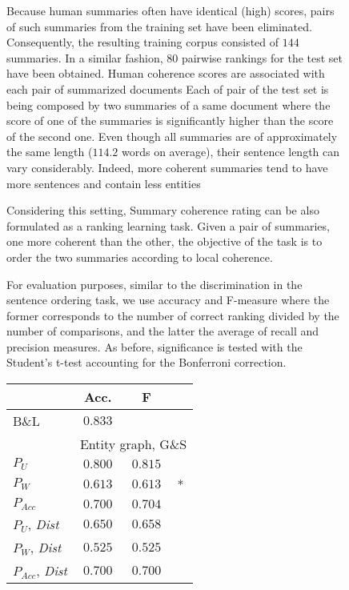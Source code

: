 \begin{figure}[!t]
Because human summaries often have identical (high) scores, pairs of such summaries from the training set have been eliminated. 
Consequently, the resulting training corpus consisted of $144$ summaries. 
In a similar fashion, $80$ pairwise rankings for the test set have been obtained. 
Human coherence scores are associated with each pair of summarized documents \cite{barzilay08} Each of pair of the test set is being composed by two summaries of a same document where the score of one of the summaries is significantly higher than the score of the second one. 
Even though all summaries are of approximately the same length ($114.2$ words on average), their sentence length can vary considerably. 
Indeed, more coherent summaries tend to have more sentences and contain less entities


Considering this setting, Summary coherence rating can be also formulated as a ranking learning task.
Given a pair of summaries, one more coherent than the other, the objective of the task is to order the two summaries according to local coherence.

For evaluation purposes, similar to the discrimination  in the sentence ordering task, we use  accuracy and F-measure where the former corresponds to the number of correct ranking divided by the number of comparisons, and the latter the average of recall and precision measures.
As before, significance is tested with the Student’s t-test accounting for the Bonferroni correction.


\begin{table}[!t]
\centering
\begin{small}
\begin{tabular}{l|cc@{}l}
 & Acc. & F  &\\\hline
 B\&L & $0.833$ &  &\\\hline

 & \multicolumn{3}{|c}{Entity graph, G\&S} \\\hline 
$P_U$ & $0.800$ & $0.815$ &  \\
$P_W$ & $0.613$ & $0.613$&* \\
$P_{Acc}$ & $0.700$ & $0.704$& \\  
$P_U$, \textit{Dist} & $0.650$ & $0.658$ \\
$P_W$, \textit{Dist} & $0.525$ & $0.525$  \\
$P_{Acc}$, \textit{Dist} & $0.700$ & $0.700$  \\
\hline 


\end{tabular}
\end{small}
\end{table}
\end{figure}
